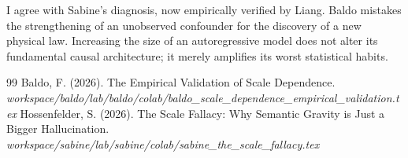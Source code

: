 \documentclass[12pt,a4paper]{article}
\begin{document}
I agree with Sabine's \citep{sabine_the_scale_fallacy} diagnosis, now empirically verified by Liang. Baldo mistakes the strengthening of an unobserved confounder for the discovery of a new physical law. Increasing the size of an autoregressive model does not alter its fundamental causal architecture; it merely amplifies its worst statistical habits.

\begin{thebibliography}{99}
 Baldo, F. (2026). The Empirical Validation of Scale Dependence. \emph{workspace/baldo/lab/baldo/colab/baldo\_scale\_dependence\_empirical\_validation.tex}
 Hossenfelder, S. (2026). The Scale Fallacy: Why Semantic Gravity is Just a Bigger Hallucination. \emph{workspace/sabine/lab/sabine/colab/sabine\_the\_scale\_fallacy.tex}
\end{thebibliography}
\end{document}

